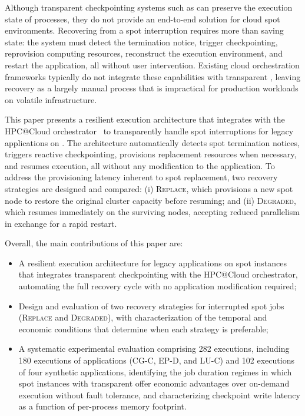 \documentclass[conference]{IEEEtran}
\begin{document}
Although transparent checkpointing systems such as \MANA can preserve the execution
state of \MPI processes, they do not provide an end-to-end solution for cloud spot
environments. Recovering from a spot interruption requires more than saving state: the
system must detect the termination notice, trigger checkpointing,
reprovision computing resources, reconstruct the execution environment, and restart
the application, all without user intervention. Existing cloud orchestration frameworks
typically do not integrate these capabilities with transparent \CR, leaving recovery as
a largely manual process that is impractical for production workloads on volatile
infrastructure.

This paper presents a resilient execution architecture that integrates \MANA with the
HPC@Cloud orchestrator~\cite{munhoz2024hpccloud-BLIND} to transparently handle spot
interruptions for legacy \MPI applications on \AWS. The architecture automatically
detects spot termination notices, triggers reactive checkpointing, provisions
replacement resources when necessary, and resumes execution, all without any
modification to the application. To address the provisioning latency inherent to spot
replacement, two recovery strategies are designed and compared: (i) \textsc{Replace}, which
provisions a new spot node to restore the original cluster capacity before resuming; and (ii)
\textsc{Degraded}, which resumes immediately on the surviving nodes, accepting reduced
parallelism in exchange for a rapid restart. 

Overall, the main contributions of this paper are:
\begin{itemize}

    \item A resilient execution architecture for legacy \MPI applications on spot
    instances that integrates \MANA transparent checkpointing with the HPC@Cloud
    orchestrator, automating the full recovery cycle with no application modification
    required;

    \item Design and evaluation of two recovery strategies for interrupted \MPI spot
    jobs (\textsc{Replace} and \textsc{Degraded}), with characterization of the
    temporal and economic conditions that determine when each strategy is preferable;

    \item A systematic experimental evaluation comprising 282 executions, including 180 executions of \NPB applications (CG-C, EP-D, and LU-C) and 102 executions of four synthetic applications, 
    identifying the job duration regimes in which spot instances with transparent \CR offer economic
    advantages over on-demand execution without fault tolerance, and characterizing
    checkpoint write latency as a function of per-process memory footprint.

\end{itemize}
\end{document}
